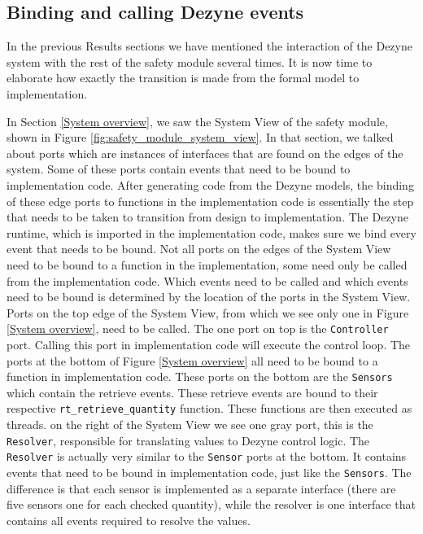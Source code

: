 \documentclass[12pt]{scrreprt}
\begin{document}
\subsection{Binding and calling Dezyne events}
\label{Binding Dezyne events to functions}
In the previous Results sections we have mentioned the interaction of the Dezyne system with the rest of the safety module several times. It is now time to elaborate how exactly the transition is made from the formal model to implementation.
\par
In Section \ref{System overview}, we saw the System View of the safety module, shown in Figure \ref{fig:safety_module_system_view}. In that section, we talked about ports which are instances of interfaces that are found on the edges of the system. Some of these ports contain events that need to be bound to implementation code. After generating code from the Dezyne models, the binding of these edge ports to functions in the implementation code is essentially the step that needs to be taken to transition from design to implementation. The Dezyne runtime, which is imported in the implementation code, makes sure we bind every event that needs to be bound. Not all ports on the edges of the System View need to be bound to a function in the implementation, some need only be called from the implementation code. Which events need to be called and which events need to be bound is determined by the location of the ports in the System View. Ports on the top edge of the System View, from which we see only one in Figure \ref{System overview}, need to be called. The one port on top is the \texttt{Controller} port. Calling this port in implementation code will execute the control loop. The ports at the bottom of Figure \ref{System overview} all need to be bound to a function in implementation code. These ports on the bottom are the \texttt{Sensors} which contain the retrieve events. These retrieve events are bound to their respective \texttt{rt\_retrieve\_quantity} function. These functions are then executed as threads. on the right of the System View we see one gray port, this is the \texttt{Resolver}, responsible for translating values to Dezyne control logic. The \texttt{Resolver} is actually very similar to the \texttt{Sensor} ports at the bottom. It contains events that need to be bound in implementation code, just like the \texttt{Sensors}. The difference is that each sensor is implemented as a separate interface (there are five sensors one for each checked quantity), while the resolver is one interface that contains all events required to resolve the values.
\end{document}
